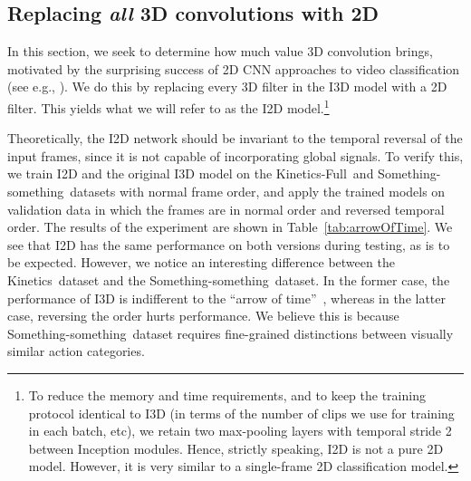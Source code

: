 \documentclass[runningheads]{llncs}
\newcommand{\Something}{Something-something}
\newcommand{\FK}{Kinetics-Full}
\newcommand{\Kinetics}{Kinetics}
\begin{document}
\subsection{Replacing \emph{all} 3D convolutions with 2D}
\label{sec:all3d}
\label{sec:pyramids}

In this section, we seek to determine how much value  3D convolution brings,
motivated by the surprising success of 2D CNN approaches
to video classification (see e.g., \cite{tsn_wang_eccv16}).
We do this by 
replacing every 3D filter in the I3D model with a 2D filter.  This yields what we will refer to as the I2D
model.\footnote{
To reduce the memory and time requirements,
and to keep
the training protocol identical to I3D (in terms of the number of clips we use for training in each batch, etc),
we retain two max-pooling layers with temporal stride 2 between 
Inception modules.
Hence, strictly speaking, I2D is not a pure 2D model. However, it is very similar to a single-frame 2D classification model.
}



Theoretically, the I2D network should be invariant to the temporal reversal of the input frames, since it is not capable of incorporating global signals. To verify this, we train I2D and the original I3D model on the \FK\ and \Something\ datasets with normal frame order, and apply the trained models on validation data in which the frames are in
normal order and reversed temporal order.
The results of the experiment are shown in Table~\ref{tab:arrowOfTime}.
We see that I2D has the same performance on both versions during testing, as is to be expected. However, 
we notice an interesting difference between the \Kinetics\ dataset and the \Something\ dataset.
In the former case, the performance of I3D is indifferent to the  ``arrow of time''~\cite{pickup2014seeing},
whereas in the latter case, reversing the order hurts performance.
We believe this is because \Something\ dataset requires fine-grained distinctions between visually similar action categories.
\end{document}
